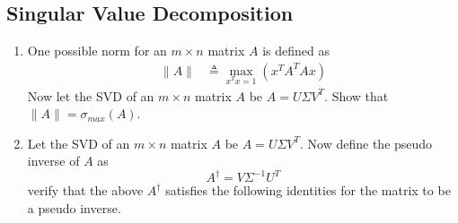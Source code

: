 \documentclass[journal,12pt,twocolumn]{IEEEtran}
\begin{document}
\subsection{Singular Value Decomposition}
\begin{enumerate}
\item One possible norm for an $m\times n$ matrix $A$ is defined as
\begin{align*}
\|A\| &\triangleq \max_{x^Tx=1}{(x^TA^TAx)}
\end{align*}
%
Now let the SVD of an $m \times n$ matrix $A$ be $A=U \Sigma{V^T}.$ Show that $\|A\|=\sigma_{max}(A)$.
\item Let the SVD of an $m\times n$ matrix $A$ be $A=U\Sigma{V^T}$. Now define the pseudo inverse of $A$ as
\begin{equation}
A^\dagger=V\Sigma^{-1}U^{T}
\end{equation}
%
verify that the above $A^\dagger$ satisfies the following identities for the matrix to be a pseudo inverse.
\begin{enumerate}[(i)]
\end{enumerate}
\end{enumerate}
%
\end{document}
